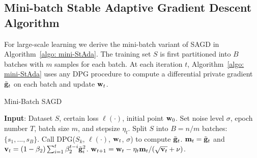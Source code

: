 \documentclass[11pt]{article}
\begin{document}
\subsection{Mini-batch Stable Adaptive Gradient Descent Algorithm}
\label{mini-batch algorithm}
\vspace{-0.05in}
For large-scale learning we derive the mini-batch variant of \textsc{SAGD} in Algorithm~\ref{algo: mini-StAda}. 
The training set $S$ is first partitioned into $B$ batches with $m$ samples for each batch. 
At each iteration $t$, Algorithm~\ref{algo: mini-StAda} uses any DPG procedure to compute a differential private gradient $\tilde {\mathbf{g}}_t$ on each batch and update $\mathbf{w}_t$. 
\begin{algorithm}[H] 
\caption{Mini-Batch \textsc{SAGD}}
\begin{algorithmic}[1] \label{algo: mini-StAda}
\STATE \textbf{Input}: Dataset $S$,  certain loss $\ell(\cdot)$, initial point $\mathbf{w}_0$.
\STATE Set noise level $\sigma$, epoch number $T$,  batch size $m$, and stepsize $\eta_t$.
\STATE Split $S$ into $B=n/m$ batches: $\{ s_1,..., s_B\}$.
\STATE \label{line:dpgmini} Call DPG($S_k$,  $\ell(\cdot)$, $\mathbf{w}_t$, $\sigma$) to compute $\tilde {\mathbf{g}}_t$.
\STATE \label{line:mini1} $\mathbf{m}_t = \tilde {\mathbf{g}}_t$ and $\mathbf{v}_t = \left(1-\beta_{2}\right) \sum_{i=1}^{t} \beta_{2}^{t-i} \tilde {\mathbf{g}}_{i}^{2}$.
\STATE \label{line:mini2} $\mathbf{w}_{t+1}=\mathbf{w}_{t}-\eta_t \mathbf{m}_t /(\sqrt{\mathbf{v}_t}+\nu)$.
\ENDFOR
\ENDFOR 
\end{algorithmic}
\end{algorithm} 
\end{document}
